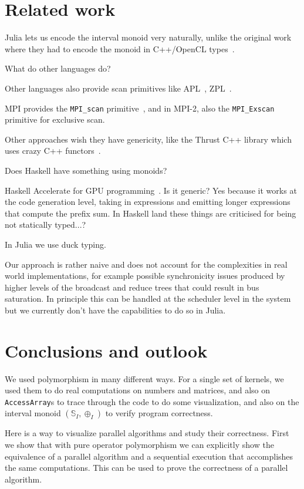 \documentclass{sig-alternate}
\newcommand{\code}[1]{\texttt{#1}}
\newcommand{\TODO}[1]{\todo[inline]{#1}}
\begin{document}
\section{Related work}

\TODO{Cleanup}

Julia lets us encode the interval monoid very naturally, unlike the original work where they had to encode the monoid in C++/OpenCL types~\cite{Chong2014}.

What do other languages do?

Other languages also provide scan primitives like APL~\cite{Iverson1962,Iverson1979}, ZPL~\cite{Chamberlain2000}.

MPI provides the \code{MPI\_scan} primitive~\cite{Snir1995,MPI}, and in MPI-2, also the \code{MPI\_Exscan} primitive for exclusive scan.~\cite{MPI2}

Other approaches wish they have genericity, like the Thrust C++ library which uses crazy C++ functors~\cite{Bell2012}.

Does Haskell have something using monoids?

Haskell Accelerate for GPU programming~\cite{Chakravarty2011}. Is it generic? Yes because it works at the code generation level, taking in expressions and emitting longer expressions that compute the prefix sum. In Haskell land these things are criticised for being not statically typed...?

In Julia we use duck typing.

Our approach is rather naive and does not account for the complexities in real world implementations, for example possible synchronicity issues produced by higher levels of the broadcast and reduce trees that could result in bus saturation. In principle this can be handled at the scheduler level in the system but we currently don't have the capabilities to do so in Julia.


\section{Conclusions and outlook}

\TODO{Cleanup}

We used polymorphism in many different ways. For a single set of kernels, we used them to do real computations on numbers and matrices, and also on \code{AccessArray}s to trace through the code to do some visualization, and also on the interval monoid $(\mathbb S_I, \oplus_I)$ to verify program correctness.

Here is a way to visualize parallel algorithms and study their correctness. First we show that with pure operator polymorphism we can explicitly show the equivalence of a parallel algorithm and a sequential execution that accomplishes the same computations. This can be used to prove the correctness of a parallel algorithm.
\end{document}
